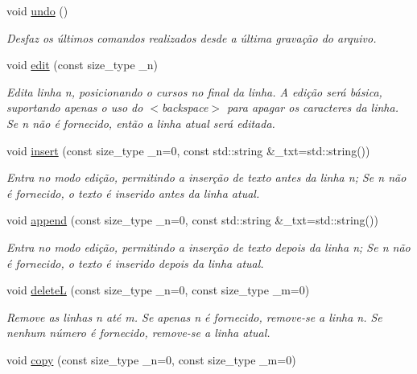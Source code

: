 \begin{DoxyCompactItemize}
\mbox{\label{classelis_a6a7a0e7b84b7021365deafc902765254}} 
void \hyperlink{classelis_a6a7a0e7b84b7021365deafc902765254}{undo} ()
\begin{DoxyCompactList}\small\item\em Desfaz os últimos comandos realizados desde a última gravação do arquivo. \end{DoxyCompactList}\item 
void \hyperlink{classelis_acba75acf4af664df02db7dca65393f19}{edit} (const size\+\_\+type \+\_\+n)
\begin{DoxyCompactList}\small\item\em Edita linha n, posicionando o cursos no final da linha. A edição será básica, suportando apenas o uso do $<$backspace$>$ para apagar os caracteres da linha. Se n não é fornecido, então a linha atual será editada. \end{DoxyCompactList}\item 
void \hyperlink{classelis_aa35b724716a8e628fa030d7c67978338}{insert} (const size\+\_\+type \+\_\+n=0, const std\+::string \&\+\_\+txt=std\+::string())
\begin{DoxyCompactList}\small\item\em Entra no modo edição, permitindo a inserção de texto antes da linha n; Se n não é fornecido, o texto é inserido antes da linha atual. \end{DoxyCompactList}\item 
void \hyperlink{classelis_a4efd2a55425f6bac58ededbc804ed794}{append} (const size\+\_\+type \+\_\+n=0, const std\+::string \&\+\_\+txt=std\+::string())
\begin{DoxyCompactList}\small\item\em Entra no modo edição, permitindo a inserção de texto depois da linha n; Se n não é fornecido, o texto é inserido depois da linha atual. \end{DoxyCompactList}\item 
void \hyperlink{classelis_ac393142dde010808f56a76e3914886a4}{deleteL} (const size\+\_\+type \+\_\+n=0, const size\+\_\+type \+\_\+m=0)
\begin{DoxyCompactList}\small\item\em Remove as linhas n até m. Se apenas n é fornecido, remove-\/se a linha n. Se nenhum número é fornecido, remove-\/se a linha atual. \end{DoxyCompactList}\item 
void \hyperlink{classelis_ae482e818bd705f4a0fa326ca2c6c6b06}{copy} (const size\+\_\+type \+\_\+n=0, const size\+\_\+type \+\_\+m=0)

\end{DoxyCompactItemize}
